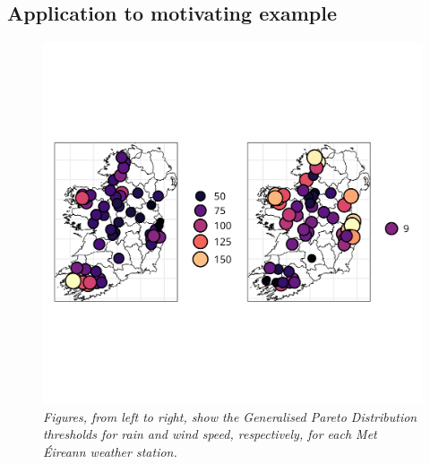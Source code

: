 \documentclass{article}
\numberwithin{equation}{section}
\begin{document}
\subsection{Application to motivating example} \label{subsec:uni_application}


\begin{figure}[H]
    \centering
    \includegraphics[width = 0.9\linewidth]{plots/031_thresh_plots.png}
    \caption{\emph{Figures, from left to right, show the Generalised Pareto Distribution thresholds for rain and wind speed, respectively, for each Met Éireann weather station.}}
    \label{fig:03_uni_thresh}
\end{figure}
\end{document}
